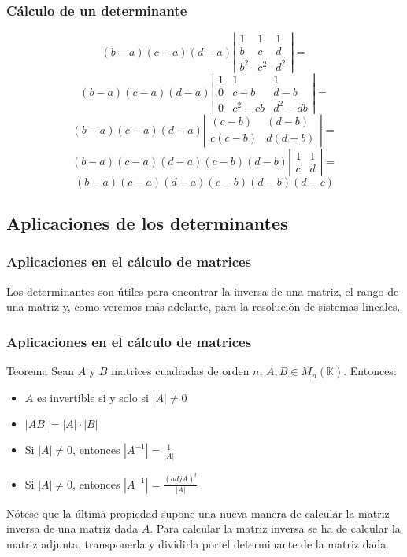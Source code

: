 \documentclass[12pt]{article}
\begin{document}
\begin{frame}
  \frametitle{C\'alculo de un determinante}
\[ (b-a)(c-a)(d-a)\left|\begin{array}{ccc} 1 & 1 & 1 \\ b & c & d \\b^2 & c^2 & d^2 \end{array}\right| =\]
\[ (b-a)(c-a)(d-a)\left|\begin{array}{ccc} 1 & 1 & 1 \\ 0 & c-b & d-b \\0 & c^2- cb & d^2-db \end{array}\right| =\]
\[ (b-a)(c-a)(d-a)\left|\begin{array}{cc}  (c-b) & (d-b) \\ c(c- b) & d(d-b) \end{array}\right| =\]
\[ (b-a)(c-a)(d-a)(c-b)(d-b)\left|\begin{array}{cc}  1 & 1 \\ c & d \end{array}\right| =\]
\[ (b-a)(c-a)(d-a)(c-b)(d-b) (d-c)\]

\end{frame} 


\subsection{Aplicaciones de los determinantes}

\begin{frame}
  \frametitle{Aplicaciones en el c\'alculo de matrices}
Los determinantes son \'utiles para encontrar la inversa de una matriz, el rango de una matriz y, como veremos m\'as adelante, para la resoluci\'on de sistemas lineales.
\end{frame}   
  
  \begin{frame}
  \frametitle{Aplicaciones en el c\'alculo de matrices}
     \begin{block}{Teorema}
Sean $A$ y $B$ matrices cuadradas de orden $n$, $A,B\in M_n(\mathbb{K})$. Entonces:
\begin{itemize}
\item $A$ es invertible si y solo si $|A|\neq 0$
\item $|AB| = |A| \cdot |B|$
\item Si $|A|\neq0$, entonces $|A^{-1}| = \frac{1}{|A|}$
\item Si $|A|\neq0$, entonces $|A^{-1}| = \frac{(adj A)^t}{|A|}$
\end{itemize}
\end{block}

N\'otese que la \'ultima propiedad supone una nueva manera de calcular la matriz inversa de una matriz dada $A$. Para calcular la matriz inversa se ha de calcular la matriz adjunta, transponerla y dividirla por el determinante de la matriz dada.
\end{frame} 
  
\end{document}
